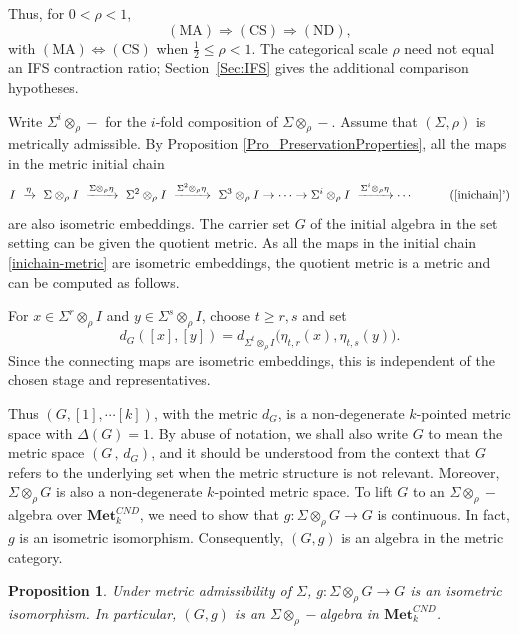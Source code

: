 \documentclass{sn-jnl}%
\theoremstyle{thmstyleone}%
\newtheorem{proposition}[theorem]{Proposition}%
\theoremstyle{thmstyletwo}%
\theoremstyle{thmstylethree}%
\newcommand{\mcnd}{\mathbf{Met}_{k}^{CND}}
\newcommand{\M}{\Sigma}
\newcommand{\Fw}{\M\otimes_{\w}}
\newcommand{\Fwi}[1]{\M^{#1}\otimes_{\w}}
\newcommand{\w}{\rho}
\begin{document}
Thus, for $0<\rho<1$,
\begin{equation} 
\nonumber
    \mathrm{(MA)} \Longrightarrow \mathrm{(CS)} \Longrightarrow \mathrm{(ND)},
\end{equation}
with $\mathrm{(MA)}\Longleftrightarrow\mathrm{(CS)}$ when $\frac12\leq\rho<1$. The categorical scale $\rho$ need not equal an IFS contraction ratio; Section~\ref{Sec:IFS} gives the additional comparison hypotheses.

Write $\Fwi{i} -$ for the $i$-fold composition of $\Fw -$. Assume that $(\Sigma,\w)$ is metrically admissible.  By Proposition \ref{Pro_PreservationProperties}, all the maps in the metric initial chain 
\begin{equation}
    I~\xrightarrow{\eta}~ \Fw I ~\xrightarrow{\Fw \eta}~ \Fwi{2} I ~\xrightarrow{\Fwi{2} \eta} ~ \Fwi{3} I \rightarrow \cdots \rightarrow \Fwi{i} I ~\xrightarrow{\Fwi{i} \eta}\cdots~~~
\label{inichain-metric} 
\tag{\ref{inichain}'}
\end{equation}
are also isometric embeddings. The carrier set $G$ of the initial algebra in the set setting can be given the quotient metric. As all the maps in the initial chain \eqref{inichain-metric} are isometric embeddings, the quotient metric is a metric and can be computed as follows. 

For $x\in\Fwi{r}I$ and $y\in\Fwi{s}I$, choose $t\geq r,s$ and set
\begin{equation} 
\nonumber
    d_G([x],[y]) = d_{\Fwi{t}I}\bigl(\eta_{t,r}(x),\eta_{t,s}(y)\bigr).
\end{equation}
Since the connecting maps are isometric embeddings, this is independent of the chosen stage and representatives.

Thus $(G, [1],\cdots [k])$, with the metric $d_G$, is a non-degenerate $k$-pointed metric space with $\Delta(G)=1$. By abuse of notation, we shall also write  $G$ to mean the metric space $(G\,,\,d_G)$, and it should be understood from the context that $G$ refers to the underlying set  when the metric structure is not relevant. Moreover, $\Fw G$ is also a non-degenerate $k$-pointed metric space. To lift $G$ to an $\Fw-$ algebra over $\mcnd$, we need to show that $g:\Fw G \rightarrow G$ is continuous. In fact, $g$ is an isometric isomorphism. Consequently, $(G,g)$ is an algebra in the metric category.

\begin{proposition}
\label{Prop_GasAMetricAlgebra}
    Under metric admissibility of $\Sigma$, $g:\Fw G\to G$ is an isometric isomorphism. In particular, $(G,g)$ is an $\Fw-$algebra in $\mcnd$.
\end{proposition}
\end{document}
